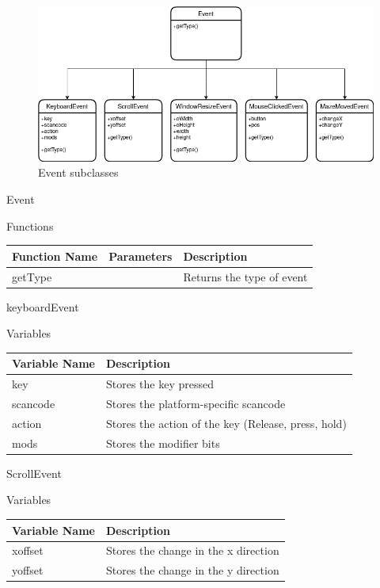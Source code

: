 \documentclass[../../Main.tex]{subfiles}
\begin{document}
    \begin{figure}[hbt!]
        \centerline{\includegraphics[scale=0.5]{img/Classes/Events.png}}
        \caption{Event subclasses}
        \label{fig}
    \end{figure}
    Event
    \begin{center}
        Functions
        \begin{tabular}{ | m{} | m{}| m{} | }
            \hline
            \textbf{Function Name} & \textbf{Parameters} & \textbf{Description} \\
            \hline
            getType & & Returns the type of event \\
            \hline
        \end{tabular}
    \end{center}
    keyboardEvent
    \begin{center}
        Variables
        \begin{tabular}{ | m{} | m{} | }
            \hline
            \textbf{Variable Name} & \textbf{Description} \\
            \hline
            key & Stores the key pressed \\
            \hline
            scancode & Stores the platform-specific scancode \\
            \hline
            action & Stores the action of the key (Release, press, hold)\\
            \hline
            mods & Stores the modifier bits \\
            \hline
        \end{tabular}
    \end{center}
    ScrollEvent
    \begin{center}
        Variables
        \begin{tabular}{ | m{} | m{} | }
            \hline
            \textbf{Variable Name} & \textbf{Description} \\
            \hline
            xoffset & Stores the change in the x direction \\
            \hline
            yoffset & Stores the change in the y direction \\
            \hline
        \end{tabular}
    \end{center}
\end{document}
